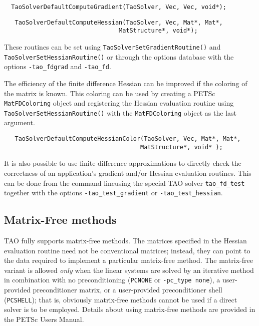 \begin{verbatim}
  TaoSolverDefaultComputeGradient(TaoSolver, Vec, Vec, void*);
\end{verbatim}


\begin{verbatim}
   TaoSolverDefaultComputeHessian(TaoSolver, Vec, Mat*, Mat*, 
                                MatStructure*, void*);
\end{verbatim}
\noindent
These routines can be set using {\tt TaoSolverSetGradientRoutine()} and 
{\tt TaoSolverSetHessianRoutine()} or through the options database with the
options {\tt -tao\_fdgrad} and {\tt -tao\_fd}.

The efficiency of the finite difference Hessian can be improved if the
coloring of the matrix is known.  This coloring can be used by creating a
PETSc {\tt MatFDColoring} object and registering the Hessian evaluation routine 
using
{\tt TaoSolverSetHessianRoutine()} with the {\tt MatFDColoring} object as
the last argument.
\begin{verbatim}
   TaoSolverDefaultComputeHessianColor(TaoSolver, Vec, Mat*, Mat*, 
                                      MatStructure*, void* );
\end{verbatim}

It is also possible to use finite difference approximations to directly check
the correctness of an application's gradient and/or Hessian evaluation routines.
This can be done from the command lineusing the special TAO solver 
{\tt tao\_fd\_test} together with the options
{\tt -tao\_test\_gradient} or {\tt -tao\_test\_hessian}.


\subsection{Matrix-Free methods}
TAO fully supports matrix-free methods. The matrices specified in the
Hessian evaluation routine need not be conventional
matrices; instead, they can point to the data required to implement a
particular matrix-free method.  The matrix-free variant is allowed
{\em only} when the linear systems are solved by an iterative method
in combination with no preconditioning ({\tt PCNONE} or {\tt -pc\_type none}),
a user-provided preconditioner matrix, or a user-provided preconditioner
shell ({\tt PCSHELL}); that is,
obviously matrix-free methods cannot be used if a direct solver is to 
be employed.  %
Details about using matrix-free methods are provided in the
PETSc  Users Manual.


